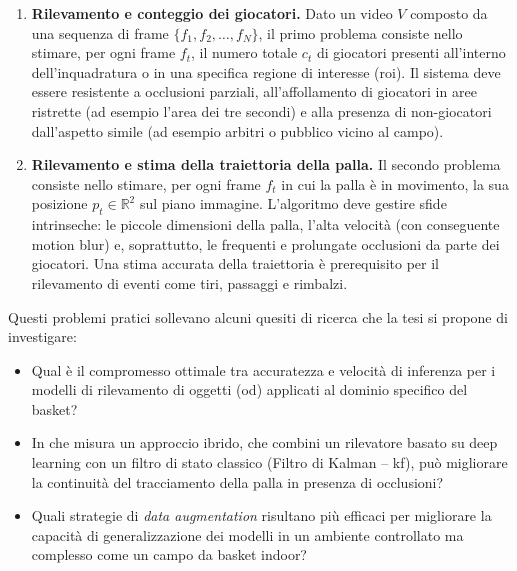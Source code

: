 \documentclass[12pt,a4paper,openright,twoside]{book}
\begin{document}
\begin{enumerate}
  \item \textbf{Rilevamento e conteggio dei giocatori.} Dato un video $V$ composto
  da una sequenza di frame $\{f_1, f_2, \ldots, f_N\}$, il primo
  problema consiste nello stimare, per ogni frame $f_t$, il numero
  totale $c_t$ di giocatori presenti all'interno dell'inquadratura o
  in una specifica regione di interesse (\ac{roi}).
  Il sistema deve essere resistente a occlusioni parziali,
  all'affollamento di giocatori in aree ristrette (ad esempio l'area dei tre secondi) 
  e alla presenza di non-giocatori dall'aspetto simile (ad esempio arbitri o pubblico 
  vicino al campo).
  \item \textbf{Rilevamento e stima della traiettoria della palla.} Il secondo
  problema consiste nello stimare, per ogni frame $f_t$ in cui la
  palla è in movimento, la sua posizione $p_t \in \mathbb{R}^2$ sul piano immagine. 
  L'algoritmo deve gestire sfide intrinseche: le piccole dimensioni della palla, 
  l'alta velocità (con conseguente motion blur) e, soprattutto, le frequenti 
  e prolungate occlusioni da parte dei giocatori. 
  Una stima accurata della traiettoria è prerequisito per il rilevamento di 
  eventi come tiri, passaggi e rimbalzi.
\end{enumerate}

Questi problemi pratici sollevano alcuni quesiti di ricerca che
la tesi si propone di investigare:
\begin{itemize}
  \item Qual è il compromesso ottimale tra accuratezza e velocità di
  inferenza per i modelli di rilevamento di oggetti (\ac{od}) applicati 
  al dominio specifico del basket?
  \item In che misura un approccio ibrido, che combini un rilevatore
  basato su deep learning con un filtro di stato classico (Filtro di
  Kalman -- \ac{kf}), può migliorare la continuità del tracciamento della palla
  in presenza di occlusioni?
  \item Quali strategie di \emph{data augmentation} risultano più efficaci 
  per migliorare la capacità di generalizzazione dei modelli in un
  ambiente controllato ma complesso come un campo da basket indoor?
\end{itemize}

\end{document}
